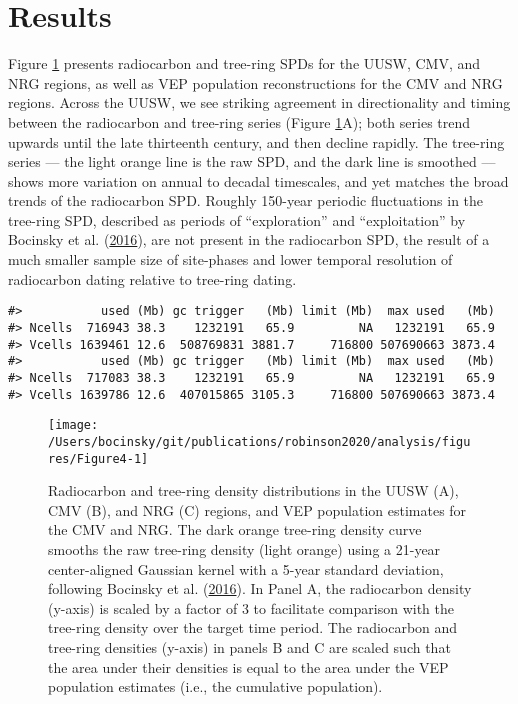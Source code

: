 \documentclass[
]{sa}
\begin{document}
\hypertarget{results}{%
\section*{Results}\label{results}}

Figure \ref{fig:Figure4} presents radiocarbon and tree-ring SPDs for the UUSW, CMV, and NRG regions, as well as VEP population reconstructions for the CMV and NRG regions. Across the UUSW, we see striking agreement in directionality and timing between the radiocarbon and tree-ring series (Figure \ref{fig:Figure4}A); both series trend upwards until the late thirteenth century, and then decline rapidly. The tree-ring series --- the light orange line is the raw SPD, and the dark line is smoothed --- shows more variation on annual to decadal timescales, and yet matches the broad trends of the radiocarbon SPD. Roughly 150-year periodic fluctuations in the tree-ring SPD, described as periods of ``exploration'' and ``exploitation'' by Bocinsky et al. (\protect\hyperlink{ref-Bocinsky2016}{2016}), are not present in the radiocarbon SPD, the result of a much smaller sample size of site-phases and lower temporal resolution of radiocarbon dating relative to tree-ring dating.



\begin{verbatim}
#>           used (Mb) gc trigger   (Mb) limit (Mb)  max used   (Mb)
#> Ncells  716943 38.3    1232191   65.9         NA   1232191   65.9
#> Vcells 1639461 12.6  508769831 3881.7     716800 507690663 3873.4
#>           used (Mb) gc trigger   (Mb) limit (Mb)  max used   (Mb)
#> Ncells  717083 38.3    1232191   65.9         NA   1232191   65.9
#> Vcells 1639786 12.6  407015865 3105.3     716800 507690663 3873.4
\end{verbatim}

\begin{figure}

{\centering \texttt{[image: /Users/bocinsky/git/publications/robinson2020/analysis/figures/Figure4-1]} 

}

\caption{Radiocarbon and tree-ring density distributions in the UUSW (A), CMV (B), and NRG (C) regions, and VEP population estimates for the CMV and NRG. The dark orange tree-ring density curve smooths the raw tree-ring density (light orange) using a 21-year center-aligned Gaussian kernel with a 5-year standard deviation, following Bocinsky et al. (\protect\hyperlink{ref-Bocinsky2016}{2016}). In Panel A, the radiocarbon density (y-axis) is scaled by a factor of 3 to facilitate comparison with the tree-ring density over the target time period. The radiocarbon and tree-ring densities (y-axis) in panels B and C are scaled such that the area under their densities is equal to the area under the VEP population estimates (i.e., the cumulative population).}\label{fig:Figure4}
\end{figure}
\end{document}
